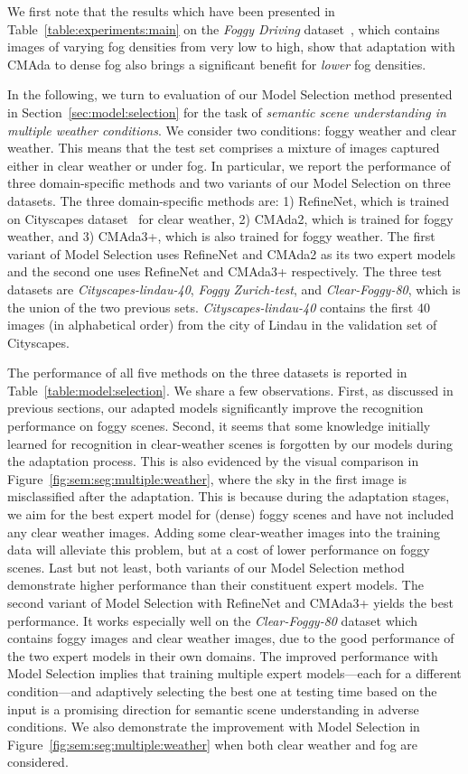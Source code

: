 \documentclass[twocolumn]{svjour3}          \smartqed  \usepackage{graphicx}
\begin{document}
We first note that the results which have been presented in Table~\ref{table:experiments:main} on the \emph{Foggy Driving} dataset~\cite{SFSU_synthetic}, which contains images of varying fog densities from very low to high, show that adaptation with CMAda to dense fog also brings a significant benefit for \emph{lower} fog densities.

In the following, we turn to evaluation of our Model Selection method presented in Section~\ref{sec:model:selection} for the task of \emph{semantic scene understanding in multiple weather conditions}. We consider two conditions: foggy weather and clear weather. This means that the test set comprises a mixture of images captured either in clear weather or under fog. In particular, we report the performance of three domain-specific methods and two variants of our Model Selection on three datasets. The three domain-specific methods are: 1) RefineNet, which is trained on Cityscapes dataset~\cite{refinenet} for clear weather, 2) CMAda2, which is trained for foggy weather, and 3) CMAda3+, which is also trained for foggy weather. The first variant of Model Selection uses RefineNet and CMAda2 as its two expert models and the second one uses RefineNet and CMAda3+ respectively. The three test datasets are \emph{Cityscapes-lindau-40}, \emph{Foggy Zurich-test}, and \emph{Clear-Foggy-80}, which is the union of the two previous sets. \emph{Cityscapes-lindau-40} contains the first 40 images (in alphabetical order) from the city of Lindau in the validation set of Cityscapes.

The performance of all five methods on the three datasets is reported in Table~\ref{table:model:selection}. We share a few observations. First, as discussed in previous sections, our adapted models significantly improve the recognition performance on foggy scenes. Second, it seems that some knowledge initially learned for recognition in clear-weather scenes is forgotten by our models during the adaptation process.  This is also evidenced by the visual comparison in Figure~\ref{fig:sem:seg:multiple:weather}, where the sky in the first image is misclassified after the adaptation.
This is because during the adaptation stages, we aim for the best expert model for (dense) foggy scenes and have not included any clear weather images. Adding some clear-weather images into the training data will alleviate this problem, but at a cost of lower performance on foggy scenes. Last but not least, both variants of our Model Selection method demonstrate higher performance than their constituent expert models. The second variant of Model Selection with RefineNet and CMAda3+ yields the best performance. It works especially well on the \emph{Clear-Foggy-80} dataset which contains  foggy images and  clear weather images, due to the good performance of the two expert models in their own domains. The improved performance with Model Selection implies that training multiple expert models---each for a different condition---and adaptively selecting the best one at testing time based on the input is a promising direction for semantic scene understanding in adverse conditions. We also demonstrate the improvement with Model Selection in Figure~\ref{fig:sem:seg:multiple:weather} when both clear weather and fog are considered.
\end{document}
